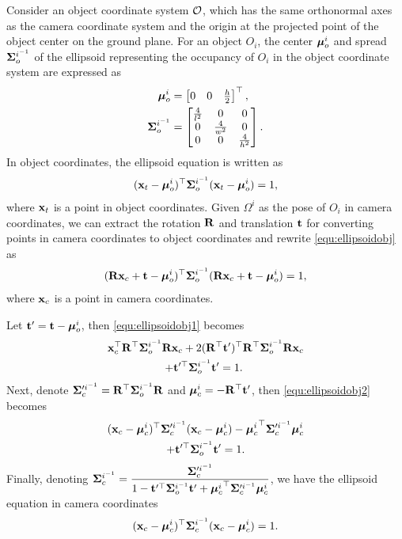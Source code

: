 \documentclass[10pt,twocolumn,letterpaper]{article}
\begin{document}
Consider an object coordinate system ${\mathcal{O}}$, which has the same orthonormal axes as the camera coordinate system and the origin at the projected point of the object center on the ground plane. For an object $O_i$, the center ${\bm{\mu}}^{i}_o$ and spread $\bm{\Sigma}^{i^{-1}}_o$ of the ellipsoid representing the occupancy of $O_i$ in the object coordinate system are expressed as
\begin{align}
  {\bm{\mu}}^{i}_o &= \begin{bmatrix}
  0& 0& \frac{h}{2}
  \end{bmatrix}^\top,\\
  \bm{\Sigma}^{i^{-1}}_o &= \begin{bmatrix}
    \frac{4}{l^2} & 0 & 0 \\
    0 & \frac{4}{w^2} & 0 \\
    0 & 0 & \frac{4}{h^2}
  \end{bmatrix}.
\end{align}
In object coordinates, the ellipsoid equation is written as
\begin{align}
  (\mathbf{x}_t - {\bm{\mu}}^{i}_o)^\top \bm{\Sigma}^{i^{-1}}_o (\mathbf{x}_t - {\bm{\mu}}^{i}_o) = 1,
\label{equ:ellipsoidobj}
\end{align}
where $\mathbf{x}_t$ is a point in object coordinates. Given $\Omega^i$ as the pose of $O_i$ in camera coordinates, we can extract the rotation $\mathbf{R}$ and translation $\mathbf{t}$ for converting points in camera coordinates to object coordinates and rewrite \eqref{equ:ellipsoidobj} as
\begin{align}
  (\mathbf{R} \mathbf{x}_c + \mathbf{t} - {\bm{\mu}}^{i}_o)^\top \bm{\Sigma}^{i^{-1}}_o (\mathbf{R} \mathbf{x}_c + \mathbf{t} - {\bm{\mu}}^{i}_o) = 1,
\label{equ:ellipsoidobj1}
\end{align}
where $\mathbf{x}_c$ is a point in camera coordinates.

Let $\mathbf{t}' = \mathbf{t} - {\bm{\mu}}^{i}_o$, then \eqref{equ:ellipsoidobj1} becomes
\begin{multline}
  \mathbf{x}_c^\top \mathbf{R}^\top \bm{\Sigma}^{i^{-1}}_o \mathbf{R} \mathbf{x}_c + 2 (\mathbf{R}^\top \mathbf{t}')^\top  \mathbf{R}^\top\bm{\Sigma}^{i^{-1}}_o \mathbf{R} \mathbf{x}_c
  \\
  + \mathbf{t}'^\top \bm{\Sigma}^{i^{-1}}_o \mathbf{t}' = 1.
\
\label{equ:ellipsoidobj2}
\end{multline}
Next, denote $\bm{\Sigma}'^{i^{-1}}_c = \mathbf{R}^\top \bm{\Sigma}^{i^{-1}}_o \mathbf{R}$ and ${{\bm{\mu}}^{i}_c} = - \mathbf{R}^\top
\mathbf{t}'$, then \eqref{equ:ellipsoidobj2} becomes
\begin{multline}
  (\mathbf{x}_c - {{\bm{\mu}}^{i}_c})^\top\bm{\Sigma}'^{i^{-1}}_c(\mathbf{x}_c - {{\bm{\mu}}^{i}_c}) - {{\bm{\mu}}^{i}_c}^\top\bm{\Sigma}'^{i^{-1}}_c{{\bm{\mu}}^{i}_c} 
  \\
  + \mathbf{t}'^\top \bm{\Sigma}^{i^{-1}}_o \mathbf{t}' = 1.
\end{multline}
Finally, denoting $\bm{\Sigma}^{i^{-1}}_c = \displaystyle\frac{\bm{\Sigma}'^{i^{-1}}_c}{1 - \mathbf{t}'^\top \bm{\Sigma}^{i^{-1}}_o \mathbf{t}' +
{{\bm{\mu}}^{i}_c}^\top\bm{\Sigma}'^{i^{-1}}_c{{\bm{\mu}}^{i}_c}}$, we have the ellipsoid equation in camera coordinates
\begin{align}
(\mathbf{x}_c - {{\bm{\mu}}^{i}_c})^\top\bm{\Sigma}^{i^{-1}}_c(\mathbf{x}_c - {{\bm{\mu}}^{i}_c}) = 1.
\label{equ:ellipsoidcam}
\end{align}
\end{document}
